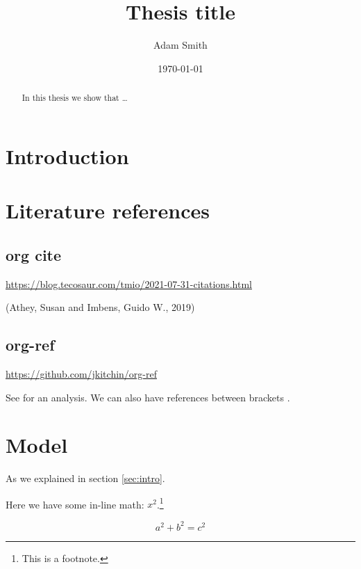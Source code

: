 \documentclass[11pt]{article}
\author{Adam Smith}
\date{\today}
\title{Thesis title}
\begin{document}
\maketitle
\begin{abstract}
In this thesis we show that \ldots{}
\end{abstract}



\newpage



\setcounter{tocdepth}{2}
\tableofcontents


\section{Introduction}
\label{sec:org566bd8f}
\label{sec:intro}



\section{Literature references}
\label{sec:org729d046}


\subsection{org cite}
\label{sec:org88254cd}

\url{https://blog.tecosaur.com/tmio/2021-07-31-citations.html}

(Athey, Susan and Imbens, Guido W., 2019)



\subsection{org-ref}
\label{sec:org25e86c2}


\url{https://github.com/jkitchin/org-ref}

See \cite{armstrong-2007-chapt-coord} for an analysis. We can also have references between brackets \citep{athey-2019-machin-learn}.


\section{Model}
\label{sec:org84e90fc}

As we explained in section \ref{sec:intro}.

Here we have some in-line math: \(x^2\).\footnote{This is a footnote.}

\begin{equation}
\label{eq:1}
a^2 + b^2 = c^2
\end{equation}
\end{document}
